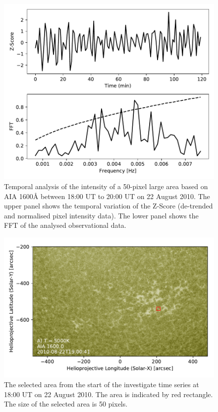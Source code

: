 \documentclass[physics,article,submit,pdftex,moreauthors]{Definitions/mdpi}
\begin{document}
\begin{figure}

    \centering
    \label{fft_sim}
    \includegraphics[scale=0.55]{AIA1600_AR_50px.pdf}
    \caption{Temporal analysis of the intensity of a 50-pixel large area based on AIA 1600{\AA} between 18:00 UT to 20:00 UT on 22 August 2010. The upper panel shows the temporal variation of the Z-Score (de-trended and normalised pixel intensity data). The lower panel shows the FFT of the analysed observational data. }
\end{figure}

\begin{figure}
    \label{obs}
    \centering
    \includegraphics[scale=0.5]{obs_data.pdf}
    \caption{ The selected area from the start of the investigate time series at 18:00 UT on 22 August 2010. The area is indicated by red rectangle. The size of the selected area is 50 pixels.}
\end{figure}
\end{document}
